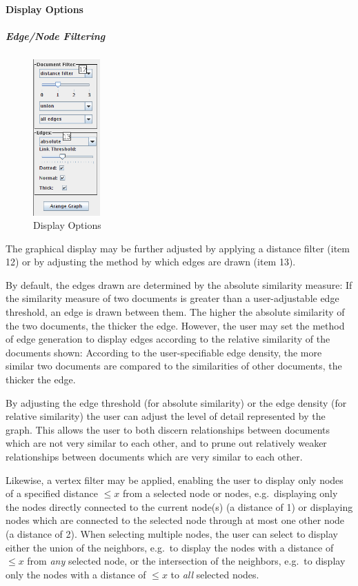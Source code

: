 \paragraph{Display Options}
\subparagraph{Edge/Node Filtering}

\begin{figure}[ht]
\centering
\caption{Display Options}
\includegraphics[height=60mm]{displayopts.png}
\end{figure}

The graphical display may be further adjusted by applying a distance filter (item 12) or by adjusting the method by which edges are drawn (item 13).

By default, the edges drawn are determined by the absolute similarity measure: If the similarity measure of two documents is greater than a user-adjustable edge threshold, an edge is drawn between them. The higher the absolute similarity of the two documents, the thicker the edge. However, the user may set the method of edge generation to display edges according to the relative similarity of the documents shown: According to the user-specifiable edge density, the more similar two documents are compared to the similarities of other documents, the thicker the edge.

By adjusting the edge threshold (for absolute similarity) or the edge density (for relative similarity) the user can adjust the level of detail represented by the graph. This allows the user to both discern relationships between documents which are not very similar to each other, and to prune out relatively weaker relationships between documents which are very similar to each other.

Likewise, a vertex filter may be applied, enabling the user to display only nodes of a specified distance $\leq x$ from a selected node or nodes, e.g.\ displaying only the nodes directly connected to the current node(s) (a distance of 1) or displaying nodes which are connected to the selected node through at most one other node (a distance of 2). When selecting multiple nodes, the user can select to display either the union of the neighbors, e.g.\ to display the nodes with a distance of $\leq x$ from \emph{any} selected node, or the intersection of the neighbors, e.g.\ to display only the nodes with a distance of $\leq x$ to \emph{all} selected nodes.

